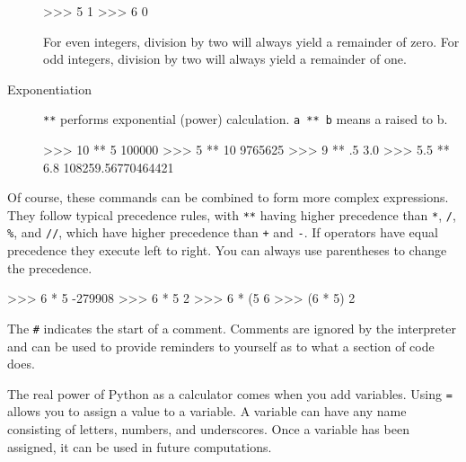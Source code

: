 \documentclass[11pt]{cselabheader}
\begin{document}
\begin{description}
    \begin{python3code}
>>> 5 %
1
>>> 6 %
0
    \end{python3code}
    For even integers, division by two will always yield a remainder of zero.
    For odd integers, division by two will always yield a remainder of one.

  \item[Exponentiation] \texttt{**} performs exponential (power) calculation.
    \texttt{a ** b} means a raised to b.

    \begin{python3code}
>>> 10 ** 5
100000
>>> 5 ** 10 
9765625
>>> 9 ** .5
3.0
>>> 5.5 ** 6.8
108259.56770464421
    \end{python3code}

%
%
\end{description}

Of course, these commands can be combined to form more complex expressions. They
follow typical precedence rules, with \texttt{**} having higher precedence than
\texttt{*}, \texttt{/}, \texttt{\%}, and \texttt{//}, which have higher
precedence than \texttt{+} and \texttt{-}. If operators have equal precedence
they execute left to right. You can always use parentheses to change the
precedence.

\begin{python3code}
>>> 6 * 5 %
-279908
>>> 6 * 5 %
2
>>> 6 * (5 %
6
>>> (6 * 5) %
2
\end{python3code}

The \texttt{\#} indicates the start of a comment. Comments are ignored by the
interpreter and can be used to provide reminders to yourself as to what a
section of code does.

The real power of Python as a calculator comes when you add variables. Using
\texttt{=} allows you to assign a value to a variable. A variable can have any
name consisting of letters, numbers, and underscores. Once a variable has been
assigned, it can be used in future computations.
\end{document}
